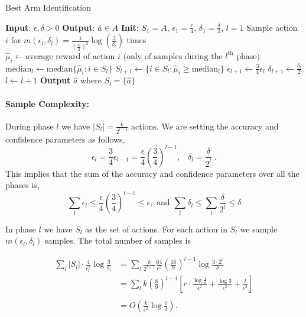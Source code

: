 \begin{algorithm}
\caption{Best Arm Identification}
\begin{algorithmic}[1]
\State \textbf{Input}: $\epsilon, \delta > 0$
\State \textbf{Output}: $\bar{a} \in A$
\State \textbf{Init}: $S_{1} = A$, $\epsilon_{1} = \frac{\epsilon}{4}$, $\delta_{1} = \frac{\delta}{2}$, $l = 1$
\Repeat
        \State Sample action $i$ for $m(\epsilon_l, \delta_l) = \frac{1}{\left(\frac{\epsilon_{l}}{2}\right)^2} \log \left(\frac{3}{\delta_{l}}\right)$ times
        \State $\hat{\mu}_{i} \leftarrow \text{average reward of action } i \text{ (only of samples during the } l^{\text{th}} \text{ phase)}$
    \EndFor
    \State $\text{median}_{l} \leftarrow \text{median} \{ \hat{\mu}_{i} : i \in S_{l} \}$
    \State $S_{l+1} \leftarrow \{ i \in S_{l} : \hat{\mu}_{i} \geq \text{median}_{l} \}$
    \State $\epsilon_{l+1} \leftarrow \frac{3}{4} \epsilon_{l}$
    \State $\delta_{l+1} \leftarrow \frac{\delta_{l}}{2}$
    \State $l \leftarrow l + 1$
\State \textbf{Output} $\hat{a}$ where $S_l = \{\hat{a}\}$
\end{algorithmic}
\end{algorithm}

\paragraph{Sample Complexity:}

During phase $l$ we have $\left|S_{l}\right|=\frac{k}{2^{l-1}}$
actions. We are setting the accuracy and confidence parameters as follows,
\[
\epsilon_{l}=\frac{3}{4}\epsilon_{l-1}=\frac{\epsilon}{4}\left(\frac{3}{4}\right)^{l-1},\;\;\;\delta_{l}=\frac{\delta}{2^{l}}\;.
\]
This implies that the sum of the accuracy and confidence parameters over all the phases is,
\[
 \sum_l\epsilon_{l}\le\frac{\epsilon}{4}\left(\frac{3}{4}\right)^{l-1}\le \epsilon, \text{ and } \sum_l\delta_{l}\le\sum_l \frac{\delta}{2^{l}} \le\delta
\]

In phase $l$ we have $S_l$ as the set of actions. For each action in $S_l$ we sample $m(\epsilon_l,\delta_l)$ samples.
The total number of samples is

\begin{align*}
 \sum_l |S_l| \cdot \frac{4}{\epsilon_l^2}\log \frac{3}{\delta_l} &=
\sum_{l}\frac{k}{2^{l-1}}\frac{64}{\epsilon^{2}}\left(\frac{16}{9}\right)^{l-1}\log\frac{3\cdot2^{l}}{\delta}\\
& =  {\displaystyle \sum_{l}k\left(\frac{8}{9}\right)^{l-1}\left[c\cdot\frac{\log\frac{1}{\delta}}{\epsilon^{2}}+\frac{\log3}{\epsilon^{2}}+\frac{l}{\epsilon^{2}}\right]}\\
\\
 & =  O\left(\frac{k}{\epsilon^{2}}\log\frac{1}{\delta}\right).
\end{align*}


